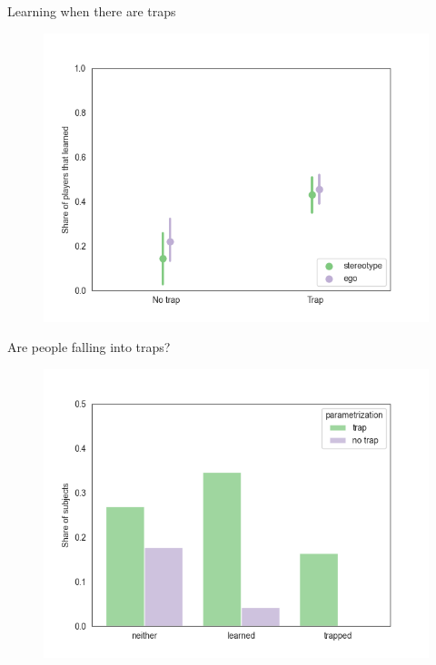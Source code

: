 \documentclass[aspectratio=169]{beamer}
\begin{document}
\begin{frame}{Learning when there are traps}
    \begin{figure}
        \centering
        \includegraphics[scale=.6]{learning_trap_presence.png}
    \end{figure}

\end{frame}

\begin{frame}{Are people falling into traps?}
    \begin{figure}
        \centering
        \includegraphics[scale=.6]{trap_learning.png}
    \end{figure}
    \label{traps}

\end{frame}
\end{document}
